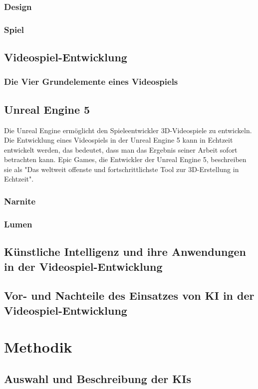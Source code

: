 \documentclass[10pt,a4paper,bibliography=totocnumbered,listof=totocnumbered]{scrartcl}
\begin{document}
\subsubsection{Design}%
\subsubsection{Spiel}%
\subsection{Videospiel-Entwicklung}
\subsubsection{Die Vier Grundelemente eines Videospiels}%
\subsection{Unreal Engine 5}
Die Unreal Engine ermöglicht den Spieleentwickler 3D-Videospiele zu entwickeln. Die Entwicklung eines Videospiels in der Unreal Engine 5 kann in Echtzeit entwickelt werden, das bedeutet, dass man das Ergebnis seiner Arbeit sofort betrachten kann. Epic Games, die Entwickler der Unreal Engine 5, beschreiben sie als "Das weltweit offenste und fortschrittlichste Tool zur 3D-Erstellung in Echtzeit".
\subsubsection{Narnite}
\subsubsection{Lumen}
\subsection{Künstliche Intelligenz und ihre Anwendungen in der Videospiel-Entwicklung}
\subsection{Vor- und Nachteile des Einsatzes von KI in der Videospiel-Entwicklung}
\section{Methodik}
\subsection{Auswahl und Beschreibung der KIs}
\end{document}
